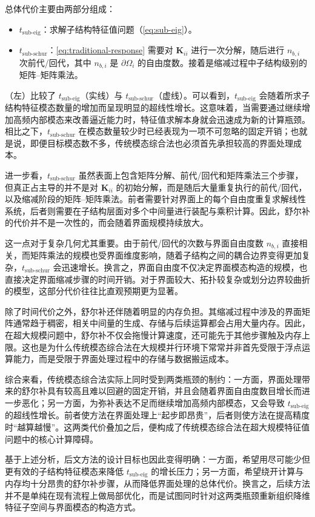 总体代价主要由两部分组成：
\begin{itemize}
    \item $t_{\text{sub-eig}}$：求解子结构特征值问题（\cref{eq:sub-eig}）。
    \item $t_{\text{sub-schur}}$：\cref{eq:traditional-response}
      需要对 $\mathbf{K}_{ii}$ 进行一次分解，随后进行 $n_{b,i}$ 次前代/回代，其中 $n_{b,i}$ 是 $\partial \Omega_i$ 的自由度数。接着是缩减过程中子结构级别的矩阵--矩阵乘法。
\end{itemize}

（左）比较了 $t_{\text{sub-eig}}$（实线）与 $t_{\text{sub-schur}}$（虚线）。可以看到，$t_{\text{sub-eig}}$ 会随着所求子结构特征模态数量的增加而呈现明显的超线性增长。这意味着，当需要通过继续增加高频内部模态来改善逼近能力时，特征值求解本身就会迅速成为新的计算瓶颈。相比之下，$t_{\text{sub-schur}}$ 在模态数量较少时已经表现为一项不可忽略的固定开销；也就是说，即便目标模态数不多，传统模态综合法也必须首先承担较高的界面处理成本。

进一步看，$t_{\text{sub-schur}}$ 虽然表面上包含矩阵分解、前代/回代和矩阵乘法三个步骤，但真正占主导的并不是对 $\mathbf{K}_{ii}$ 的初始分解，而是随后大量重复执行的前代/回代，以及缩减阶段的矩阵--矩阵乘法。前者需要针对界面上的每个自由度重复求解线性系统，后者则需要在子结构层面对多个中间量进行装配与乘积计算。因此，舒尔补的代价并不是一次性的，而会随着界面规模持续放大。

这一点对于复杂几何尤其重要。由于前代/回代的次数与界面自由度数 $n_{b,i}$ 直接相关，而矩阵乘法的规模也受界面维度影响，随着子结构之间的耦合边界变得更加复杂，$t_{\text{sub-schur}}$ 会迅速增长。换言之，界面自由度不仅决定界面模态构造的规模，也直接决定界面缩减步骤的时间开销。对于界面较大、拓扑较复杂或划分边界较曲折的模型，这部分代价往往比直观预期更为显著。

除了时间代价之外，舒尔补还伴随着明显的内存负担。其缩减过程中涉及的界面矩阵通常趋于稠密，相关中间量的生成、存储与后续运算都会占用大量内存。因此，在超大规模问题中，舒尔补不仅会拖慢计算速度，还可能先于其他步骤触及内存上限。这也是为什么传统模态综合法在大规模并行环境下常常并非首先受限于浮点运算能力，而是受限于界面处理过程中的存储与数据搬运成本。

综合来看，传统模态综合法实际上同时受到两类瓶颈的制约：一方面，界面处理带来的舒尔补具有较高且难以回避的固定开销，并且会随着界面自由度数目增长而进一步恶化；另一方面，为弥补表达不足而继续增加高频内部模态，又会导致 $t_{\text{sub-eig}}$ 的超线性增长。前者使方法在界面处理上“起步即昂贵”，后者则使方法在提高精度时“越算越慢”。这两类代价叠加之后，便构成了传统模态综合法在超大规模特征值问题中的核心计算障碍。

基于上述分析，后文方法的设计目标也因此变得明确：一方面，希望用尽可能少但更有效的子结构特征模态来降低 $t_{\text{sub-eig}}$ 的增长压力；另一方面，希望绕开计算与内存均十分昂贵的舒尔补步骤，从而降低界面处理的总体代价。换言之，后续方法并不是单纯在现有流程上做局部优化，而是试图同时针对这两类瓶颈重新组织降维特征子空间与界面模态的构造方式。
